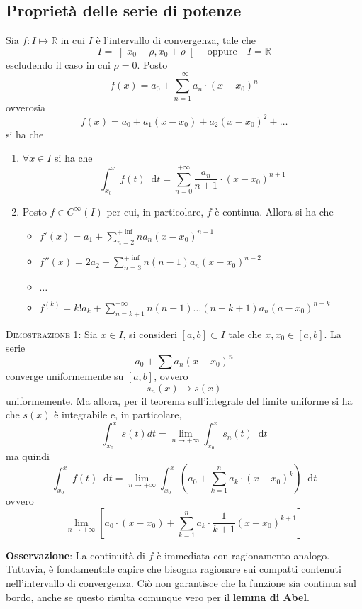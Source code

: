 \documentclass[a4paper]{extarticle}
\newcommand*\dif{\mathop{}\!\mathrm{d}}
\begin{document}
\vspace{1em}
\subsection{Proprietà delle serie di potenze}
Sia $f : I \longmapsto \mathbb{R}$ in cui $I$ è l'intervallo di convergenza, tale che
\[I = \left]x_0-\rho,x_0+\rho\right[ \hspace{1em} \text{oppure} \hspace{1em} I = \mathbb{R}\] 
escludendo il caso in cui $\rho=0$. Posto
\[f(x) = a_0 + \sum_{n=1}^{+\infty} a_n \cdot (x-x_0)^n\]
ovverosia
\[f(x) = a_0 + a_1 (x-x_0) + a_2 (x-x_0)^2 + \dots\]
si ha che
\begin{enumerate}
    \item $\forall x \in I$ si ha che
    \[\int_{x_0}^x f(t) \dif t = \sum_{n=0}^{+\infty} \frac{a_n}{n+1} \cdot (x-x_0)^{n+1}\]
    
    \item Posto $f \in C^{\infty}(I)$ per cui, in particolare, $f$ è continua. Allora si ha che
    \begin{itemize}
        \item $f'(x) = a_1 + \sum_{n=2}^{+\inf} n a_n (x-x_0)^{n-1} $
        \item $f''(x) = 2a_2 + \sum_{n=3}^{+\inf} n (n-1) a_n (x-x_0)^{n-2} $
        \item $\dots$
        \item $f^{(k)} = k! a_k + \sum_{n=k+1}^{+\infty} n (n-1) \dots (n-k+1) a_n (a-x_0)^{n-k}$
    \end{itemize}
\end{enumerate}

\vspace{2em}
\noindent
\normalfont \normalsize
\textsc{Dimostrazione 1}: Sia $x \in I$, si consideri $[a,b] \subset I$ tale che $x,x_0 \in [a,b]$. La serie
\[a_0+ \sum a_n (x-x_0)^n\]
converge uniformemente su $[a,b]$, ovvero
\[s_n(x) \to s(x)\]
uniformemente. Ma allora, per il teorema sull'integrale del limite uniforme si ha che $s(x)$ è integrabile e, in particolare,
\[\int_{x_0}^x s(t) dt = \lim_{n \to +\infty} \int_{x_0}^x s_n(t) \dif t\]
ma quindi
\[\int_{x_0}^x f(t) \dif t = \lim_{n \to +\infty} \int_{x_0}^x \left(a_0 + \sum_{k=1}^n a_k \cdot (x-x_0)^k\right) \dif t\]
ovvero
\[\lim_{n \to +\infty} \left[a_0 \cdot (x-x_0) + \sum_{k=1}^n a_k \cdot \frac{1}{k+1} (x-x_0)^{k+1}\right]\]

\vspace{1em}
\noindent
\textbf{Osservazione}: La continuità di $f$ è immediata con ragionamento analogo. Tuttavia, è fondamentale capire che bisogna ragionare sui compatti contenuti nell'intervallo di convergenza. Ciò non garantisce che la funzione sia continua sul bordo, anche se questo risulta comunque vero per il \textbf{lemma di Abel}.
\end{document}
